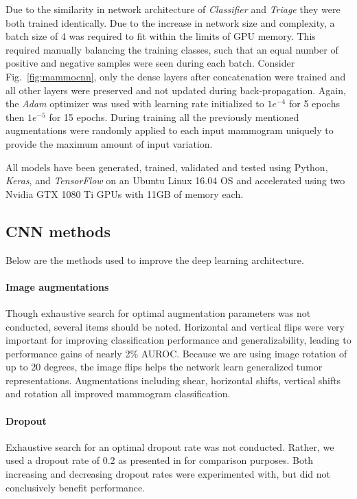 \documentclass[journal]{IEEEtran}
\begin{document}
Due to the similarity in network architecture of \textit{Classifier} and \textit{Triage} they were both trained identically. %
Due to the increase in network size and complexity, a batch size of 4 was required to fit within the limits of GPU memory. This required manually balancing the training classes, such that an equal number of positive and negative samples were seen during each batch.  Consider Fig.~\ref{fig:mammocnn}, only the dense layers after concatenation were trained and all other layers were preserved and not updated during back-propagation.  Again, the \textit{Adam} optimizer was used with learning rate initialized to $1e^{-4}$ for 5 epochs then $1e^{-5}$ for 15 epochs.  During training all the previously mentioned augmentations were randomly applied to each input mammogram uniquely to provide the maximum amount of input variation.

All models have been generated, trained, validated and tested using Python, \textit{Keras}, and \textit{TensorFlow} on an Ubuntu Linux 16.04 OS and accelerated using two Nvidia GTX 1080 Ti GPUs with 11GB of memory each.

\subsection{CNN methods}
Below are the methods used to improve the deep learning architecture.

\paragraph{Image augmentations} Though exhaustive search for optimal augmentation parameters was not conducted, several items should be noted.  Horizontal and vertical flips were very important for improving classification performance and generalizability, leading to performance gains of nearly 2\% AUROC.  Because we are using image rotation of up to 20 degrees, the image flips helps the network learn generalized tumor representations.  Augmentations including shear, horizontal shifts, vertical shifts and  rotation all improved mammogram classification.
\paragraph{Dropout} Exhaustive search for an optimal dropout rate was not conducted. Rather, we used a dropout rate of 0.2 as presented in \cite{krysztof-etal-2017} for comparison purposes. Both increasing and decreasing dropout rates were experimented with, but did not conclusively benefit performance.  
\end{document}

